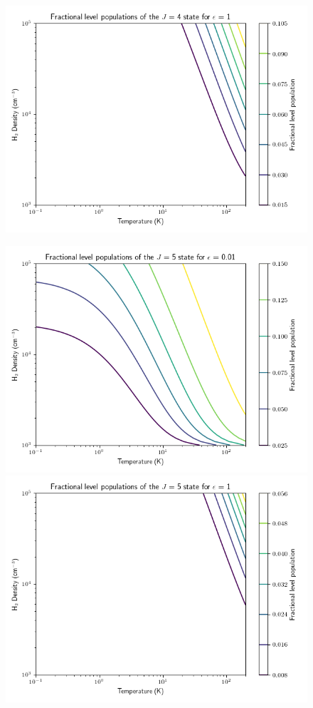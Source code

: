 \documentclass[11pt]{article}
\newenvironment{tight_enumerate}{
\begin{enumerate}[label=(\alph*)]
\setlength{\itemsep}{3pt}
\setlength{\parskip}{0pt}
}{\end{enumerate}}
\begin{document}
\begin{tight_enumerate}
\begin{figure}[H]
\includegraphics[height=0.25\textheight]{1/4_1.png}
\vspace{-2.5em}
\end{figure}
\begin{figure}[H]
\centering
\includegraphics[height=0.25\textheight]{1/5_0.png}
\includegraphics[height=0.25\textheight]{1/5_1.png}

\end{figure}
\end{tight_enumerate}
\end{document}
